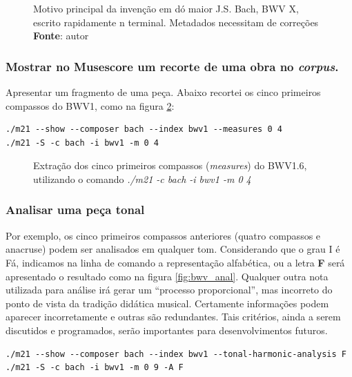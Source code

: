 \begin{figure}[h]
  \centering
  
  \caption{Motivo principal da invenção em dó maior J.S. Bach, BWV X, escrito rapidamente n terminal. Metadados necessitam de correções \textbf{Fonte}: autor}
    \label{fig:tinynotation}
\end{figure}

\subsubsection*{Mostrar no Musescore um recorte de uma obra no \emph{corpus}.}

Apresentar um fragmento de uma peça. Abaixo recortei os cinco primeiros compassos do BWV1, como na figura \ref{fig:bwv_frag}:

\begin{verbatim}
./m21 --show --composer bach --index bwv1 --measures 0 4
./m21 -S -c bach -i bwv1 -m 0 4
\end{verbatim}

\begin{figure}[h]
  \centering
  
  \caption{Extração dos cinco primeiros compassos (\emph{measures}) do BWV1.6, utilizando o comando \emph{./m21 -c bach -i bwv1 -m 0 4}}
    \label{fig:bwv_frag}
\end{figure}

\subsubsection*{Analisar uma peça tonal} 

Por exemplo, os cinco primeiros compassos anteriores (quatro compassos e anacruse) podem ser analisados em qualquer tom. Considerando que o grau I é Fá, indicamos na linha de comando a representação alfabética, ou a letra \textbf{F} será apresentado o resultado como na figura \ref{fig:bwv_anal}. Qualquer outra nota utilizada para análise irá gerar um ``processo proporcional'', mas incorreto do ponto de vista da tradição didática musical. Certamente informações podem aparecer incorretamente e outras são redundantes. Tais critérios, ainda a serem discutidos e programados, serão importantes para desenvolvimentos futuros.

\begin{verbatim}
./m21 --show --composer bach --index bwv1 --tonal-harmonic-analysis F
./m21 -S -c bach -i bwv1 -m 0 9 -A F
\end{verbatim}
 
